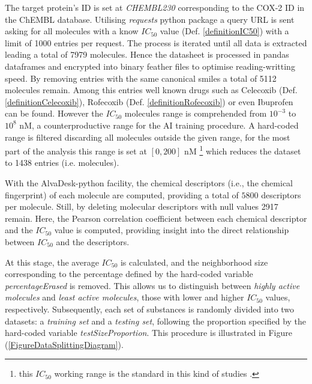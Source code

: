 \documentclass[12pt,letterpaper]{article}
\begin{document}
\begin{multicols}{2}
The target protein's ID is set at \emph{CHEMBL230} corresponding to the COX-2 ID in the ChEMBL database. Utilising \emph{requests} python package\cite{PythonPackageRequests} a query URL is sent asking for all molecules with a know $IC_{50}$ value (Def. \ref{definitionIC50}) with a limit of 1000 entries per request. The process is iterated until all data is extracted leading a total of 7979 molecules. Hence the datasheet is processed in pandas dataframes\cite{PythonPackagePandas} and encrypted into binary feather files to optimise reading-writting speed. By removing entries with the same canonical smiles a total of 5112 molecules remain. Among this entries well known drugs such as Celecoxib (Def. \ref{definitionCelecoxib}), Rofecoxib (Def. \ref{definitionRofecoxib}) or even Ibuprofen can be found. However the $IC_{50}$ molecules range is comprehended from $10^{-3}$ to $10^{8}$ nM, a counterproductive range for the AI training procedure. A hard-coded range is filtered discarding all molecules outside the given range, for the most part of the analysis this range is set at $[0,200]$ nM \footnote{this $IC_{50}$ working range is the standard in this kind of studies \cite{MachineLearningPaper5Lipoxygenase}.} which reduces the dataset to 1438 entries (i.e. molecules). \par 
With the AlvaDesk-python \cite{AlvaDescSecondPaper} facility, the chemical descriptors (i.e., the chemical fingerprint) of each molecule are computed, providing a total of $5800$ descriptors per molecule. Still, by deleting molecular descriptors with null values 2917 remain. Here, the Pearson correlation coefficient between each chemical descriptor and the $IC_{50}$ value is computed, providing insight into the direct relationship between $IC_{50}$ and the descriptors.

At this stage, the average $IC_{50}$ is calculated, and the neighborhood size corresponding to the percentage defined by the hard-coded variable \emph{percentageErased} is removed. This allows us to distinguish between \emph{highly active molecules} and \emph{least active molecules}, those with lower and higher $IC_{50}$ values, respectively. Subsequently, each set of substances is randomly divided into two datasets: a \emph{training set} and a \emph{testing set}, following the proportion specified by the hard-coded variable \emph{testSizeProportion}. This procedure is illustrated in Figure (\ref{FigureDataSplittingDiagram}).
\end{multicols}
\end{document}
